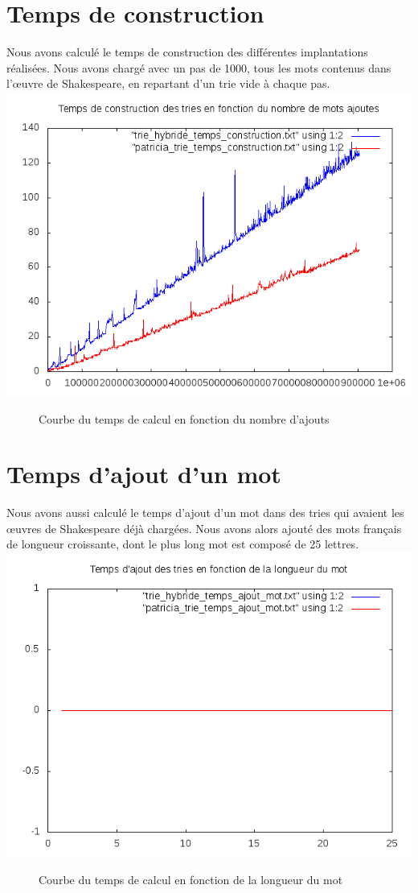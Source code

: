 \documentclass[a4paper,12pt]{report}
\begin{document}
\section{Temps de construction}
Nous avons calculé le temps de construction des différentes implantations réalisées. Nous avons chargé avec un pas de 1000,
tous les mots contenus dans l’œuvre de Shakespeare, en repartant d'un trie vide à chaque pas.\\
\includegraphics{../comparaison/courbe_temps_construction.png}
\begin{figure}[!htbp]
\caption{Courbe du temps de calcul en fonction du nombre d'ajouts}
\end{figure}

\section{Temps d'ajout d'un mot}
Nous avons aussi calculé le temps d'ajout d'un mot dans des tries qui avaient les œuvres de Shakespeare déjà chargées. Nous avons alors
ajouté des mots français de longueur croissante, dont le plus long mot est composé de 25 lettres.\\
\includegraphics{../comparaison/courbe_ajout_mot.png}
\begin{figure}[!htbp]
\caption{Courbe du temps de calcul en fonction de la longueur du mot}
\end{figure}
\end{document}
